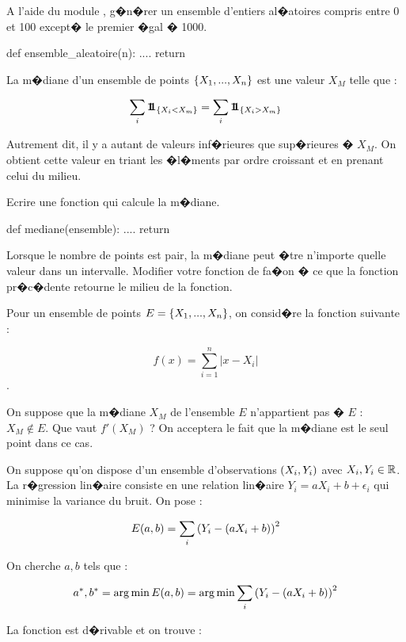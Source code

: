 \exosubject{}
\begin{xexercice}\label{td_note_label10_2017}%

\exequest A l'aide du module , g�n�rer un ensemble d'entiers al�atoires compris entre 0 et 100 except� le premier �gal � 1000.

\begin{verbatimx}
def ensemble_aleatoire(n):
    ....
    return
\end{verbatimx}

\exequest La m�diane d'un ensemble de points $\left\{X_1, ..., X_n\right\}$ est une valeur $X_M$ telle que : 

$$\sum_i \mathbf{1\!\!1}_{\left\{X_i < X_m\right\}} = \sum_i \mathbf{1\!\!1}_{\left\{X_i > X_m\right\}}$$

Autrement dit, il y a autant de valeurs inf�rieures que sup�rieures � $X_M$. On obtient cette valeur en triant les �l�ments par ordre croissant et en prenant celui du milieu.

 Ecrire une fonction qui calcule la m�diane.

\begin{verbatimx}
def mediane(ensemble):
    ....
    return
\end{verbatimx}

\exequest Lorsque le nombre de points est pair, la m�diane peut �tre n'importe quelle valeur dans un intervalle. Modifier votre fonction de fa�on � ce que la fonction pr�c�dente retourne le milieu de la fonction.

\exequest Pour un ensemble de points $E=\left\{X_1, ..., X_n\right\}$, on consid�re la fonction suivante : 

$$f(x) = \sum_{i=1}^n \left | x - X_i \right |$$.

On suppose que la m�diane $X_M$ de l'ensemble $E$ n'appartient pas � $E$ : $X_M \notin E$. Que vaut $f'(X_M)$ ?
On acceptera le fait que la m�diane est le seul point dans ce cas.

\exequest On suppose qu'on dispose d'un ensemble d'observations $\left(X_i, Y_i\right)$ avec $X_i, Y_i \in \mathbb{R}$.
La r�gression lin�aire consiste en une relation lin�aire $Y_i = a X_i + b + \epsilon_i$
qui minimise la variance du bruit. On pose :

$$
E(a, b) = \sum_i \left(Y_i - (a X_i + b)\right)^2
$$


On cherche $a, b$ tels que :

$$
a^*, b^* = \arg \min E(a, b) = \arg \min \sum_i \left(Y_i - (a X_i + b)\right)^2
$$

La fonction est d�rivable et on trouve :


\end{xexercice}
